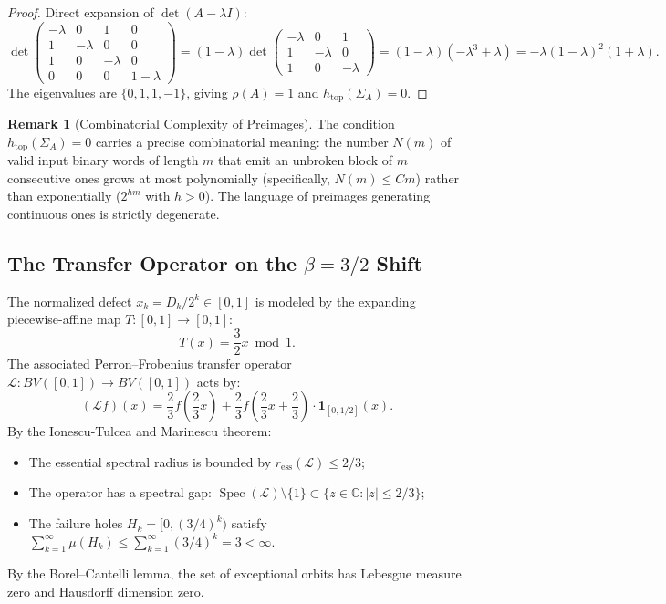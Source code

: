 \documentclass[11pt,reqno]{amsart}
\theoremstyle{definition}
\newtheorem{remark}[theorem]{Remark}
\numberwithin{equation}{section}
\begin{document}
\begin{proof}
Direct expansion of $\det(A - \lambda I)$:
\[
\det \begin{pmatrix}
-\lambda & 0 & 1 & 0 \\
1 & -\lambda & 0 & 0 \\
1 & 0 & -\lambda & 0 \\
0 & 0 & 0 & 1 - \lambda
\end{pmatrix} = (1 - \lambda) \det \begin{pmatrix}
-\lambda & 0 & 1 \\
1 & -\lambda & 0 \\
1 & 0 & -\lambda
\end{pmatrix} = (1 - \lambda)(-\lambda^3 + \lambda) = -\lambda (1 - \lambda)^2 (1 + \lambda).
\]
The eigenvalues are $\{0, 1, 1, -1\}$, giving $\rho(A) = 1$ and $h_{\mathrm{top}}(\Sigma_A) = 0$.
\end{proof}

\begin{remark}[Combinatorial Complexity of Preimages]
The condition $h_{\mathrm{top}}(\Sigma_A) = 0$ carries a precise combinatorial meaning: the number $N(m)$ of valid input binary words of length $m$ that emit an unbroken block of $m$ consecutive ones grows at most polynomially (specifically, $N(m) \le C m$) rather than exponentially ($2^{h m}$ with $h > 0$). The language of preimages generating continuous ones is strictly degenerate.
\end{remark}

\subsection{\texorpdfstring{The Transfer Operator on the $\beta = 3/2$ Shift}{The Transfer Operator on the beta = 3/2 Shift}}
The normalized defect $x_k = D_k / 2^k \in [0, 1]$ is modeled by the expanding piecewise-affine map $T : [0, 1] \to [0, 1]$:
\[
T(x) = \frac{3}{2} x \bmod 1.
\]
The associated Perron--Frobenius transfer operator $\mathcal{L} : BV([0, 1]) \to BV([0, 1])$ acts by:
\[
(\mathcal{L} f)(x) = \frac{2}{3} f\left(\frac{2}{3} x\right) + \frac{2}{3} f\left(\frac{2}{3} x + \frac{2}{3}\right) \cdot \mathbf{1}_{[0, 1/2]}(x).
\]
By the Ionescu-Tulcea and Marinescu theorem:
\begin{itemize}
    \item The essential spectral radius is bounded by $r_{\mathrm{ess}}(\mathcal{L}) \le 2/3$;
    \item The operator has a spectral gap: $\operatorname{Spec}(\mathcal{L}) \setminus \{1\} \subset \{z \in \mathbb{C} : |z| \le 2/3\}$;
    \item The failure holes $H_k = [0, (3/4)^k)$ satisfy $\sum_{k=1}^\infty \mu(H_k) \le \sum_{k=1}^\infty (3/4)^k = 3 < \infty$.
\end{itemize}
By the Borel--Cantelli lemma, the set of exceptional orbits has Lebesgue measure zero and Hausdorff dimension zero.
\end{document}
